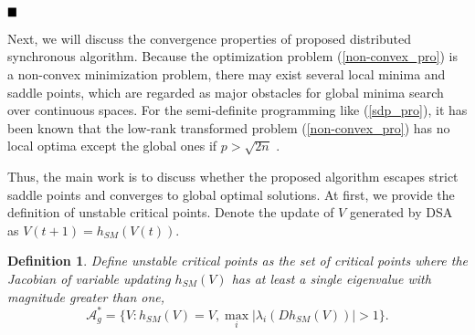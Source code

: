 \documentclass[journal]{IEEEtran}
\newtheorem{remark}{Remark}[section]
\newtheorem{definition}{Definition}[section]
\newcommand{\upcite}[1]{\textsuperscript{\textsuperscript{\cite{#1}}}}
\begin{document}
$\hfill\blacksquare$
\par Next, we will discuss the convergence properties of proposed distributed synchronous algorithm. Because the optimization problem (\ref{non-convex_pro}) is a non-convex minimization problem, there may exist several local minima and saddle points, which are regarded as major obstacles for global minima search over continuous spaces. For the semi-definite programming like (\ref{sdp_pro}), it has been known that the low-rank transformed problem (\ref{non-convex_pro}) has no local optima except the global ones if $p > \sqrt{2n}$ \cite{BM_smooth}. \par Thus, the main work is to discuss whether the proposed algorithm escapes strict saddle points and converges to global optimal solutions. At first, we provide the definition of unstable critical points. 
 Denote the update of $V$ generated by DSA as $V (t+1)= h_{SM}(V(t))$. 
\begin{definition}\label{cri_de2}
	Define unstable critical points as the set of critical points where the Jacobian of variable updating $h_{SM}(V)$ has at least a single eigenvalue with magnitude greater than one\upcite{saddle_escape},
	$$\mathcal{A}_g^*=\{V: h_{SM}(V)=V, \max_i\left|\lambda_i(Dh_{SM}(V))\right|>1\}.$$
\end{definition}
\end{document}
